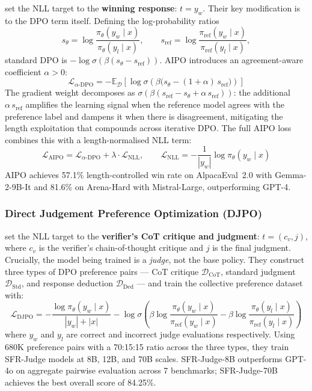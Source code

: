 \autocite{shen2024aipoimprovingtrainingobjective} set the NLL target to the \textbf{winning response}: $t = y_w$. Their key modification is to the DPO term itself. Defining the log-probability ratios
$$
    s_\theta = \log \frac{\pi_\theta(y_w \mid x)}{\pi_\theta(y_l \mid x)}, \qquad s_{\text{ref}} = \log \frac{\pi_{\text{ref}}(y_w \mid x)}{\pi_{\text{ref}}(y_l \mid x)},
$$
standard DPO is $-\log \sigma(\beta(s_\theta - s_{\text{ref}}))$. AIPO introduces an agreement-aware coefficient $\alpha > 0$:
\begin{equation}
    \mathcal{L}_{\alpha\text{-DPO}} = -\mathbb{E}_{\mathcal{D}}\!\left[\log \sigma\!\left(\beta\big(s_\theta - (1 + \alpha)\,s_{\text{ref}}\big)\right)\right]
    \label{eq:alpha_dpo}
\end{equation}
The gradient weight decomposes as $\sigma(\beta(s_{\text{ref}} - s_\theta + \alpha\, s_{\text{ref}}))$: the additional $\alpha\,s_{\text{ref}}$ amplifies the learning signal when the reference model agrees with the preference label and dampens it when there is disagreement, mitigating the length exploitation that compounds across iterative DPO. The full AIPO loss combines this with a length-normalised NLL term:
\begin{equation}
    \mathcal{L}_{\text{AIPO}} = \mathcal{L}_{\alpha\text{-DPO}} + \lambda \cdot \mathcal{L}_{\text{NLL}}, \qquad \mathcal{L}_{\text{NLL}} = -\frac{1}{|y_w|}\log \pi_\theta(y_w \mid x)
    \label{eq:aipo}
\end{equation}
AIPO achieves 57.1\% length-controlled win rate on AlpacaEval~2.0 with Gemma-2-9B-It and 81.6\% on Arena-Hard with Mistral-Large, outperforming GPT-4.

\subsubsection{Direct Judgement Preference Optimization (DJPO)}
\label{sec:djpo}

\autocite{wang2024directjudgementpreferenceoptimization} set the NLL target to the \textbf{verifier's CoT critique and judgment}: $t = (c_v, j)$, where $c_v$ is the verifier's chain-of-thought critique and $j$ is the final judgment. Crucially, the model being trained is a \textit{judge}, not the base policy. They construct three types of DPO preference pairs --- CoT critique $\mathcal{D}_{\text{CoT}}$, standard judgment $\mathcal{D}_{\text{Std}}$, and response deduction $\mathcal{D}_{\text{Ded}}$ --- and train the collective preference dataset with:
\begin{equation}
    \mathcal{L}_{\text{DJPO}} = -\frac{\log \pi_\theta(y_w^{} \mid x)}{|y_w| + |x|} - \log \sigma\!\left(\beta \log \frac{\pi_\theta(y_w \mid x)}{\pi_{\text{ref}}(y_w \mid x)} - \beta \log \frac{\pi_\theta(y_l \mid x)}{\pi_{\text{ref}}(y_l \mid x)}\right)
    \label{eq:djpo}
\end{equation}
where $y_w$ and $y_l$ are correct and incorrect judge evaluations respectively. Using 680K preference pairs with a 70:15:15 ratio across the three types, they train SFR-Judge models at 8B, 12B, and 70B scales. SFR-Judge-8B outperforms GPT-4o on aggregate pairwise evaluation across 7 benchmarks; SFR-Judge-70B achieves the best overall score of 84.25\%.

